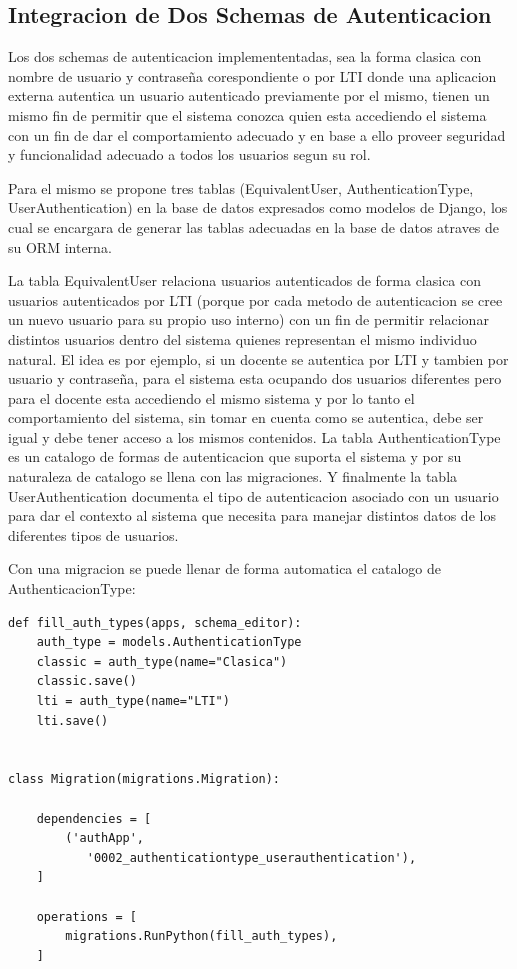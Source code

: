 \subsection{Integracion de Dos Schemas de Autenticacion}
Los dos schemas de autenticacion implemententadas, sea la forma clasica con nombre de usuario y contraseña corespondiente o por LTI donde una aplicacion externa autentica un usuario autenticado previamente por el mismo, tienen un mismo fin de permitir que el sistema conozca quien esta accediendo el sistema con un fin de dar el comportamiento adecuado y en base a ello proveer seguridad y funcionalidad adecuado a todos los usuarios segun su rol.

Para el mismo se propone tres tablas (EquivalentUser, AuthenticationType, UserAuthentication) en la base de datos expresados como modelos de Django, los cual se encargara de generar las tablas adecuadas en la base de datos atraves de su ORM interna.

La tabla EquivalentUser relaciona usuarios autenticados de forma clasica con usuarios autenticados por LTI (porque por cada metodo de autenticacion se cree un nuevo usuario para su propio uso interno) con un fin de permitir relacionar distintos usuarios dentro del sistema quienes representan el mismo individuo natural. El idea es por ejemplo, si un docente se autentica por LTI y tambien por usuario y contraseña, para el sistema esta ocupando dos usuarios diferentes pero para el docente esta accediendo el mismo sistema y por lo tanto el comportamiento del sistema, sin tomar en cuenta como se autentica, debe ser igual y debe tener acceso a los mismos contenidos. La tabla AuthenticationType es un catalogo de formas de autenticacion que suporta el sistema y por su naturaleza de catalogo se llena con las migraciones. Y finalmente la tabla UserAuthentication documenta el tipo de autenticacion asociado con un usuario para dar el contexto al sistema que necesita para manejar distintos datos de los diferentes tipos de usuarios.

Con una migracion se puede llenar de forma automatica el catalogo de AuthenticacionType:
\lstset{language=Python}
\begin{lstlisting}
def fill_auth_types(apps, schema_editor):
    auth_type = models.AuthenticationType
    classic = auth_type(name="Clasica")
    classic.save()
    lti = auth_type(name="LTI")
    lti.save()


class Migration(migrations.Migration):

    dependencies = [
        ('authApp',
           '0002_authenticationtype_userauthentication'),
    ]

    operations = [
        migrations.RunPython(fill_auth_types),
    ]
\end{lstlisting}
\lstset{language=Bash}

